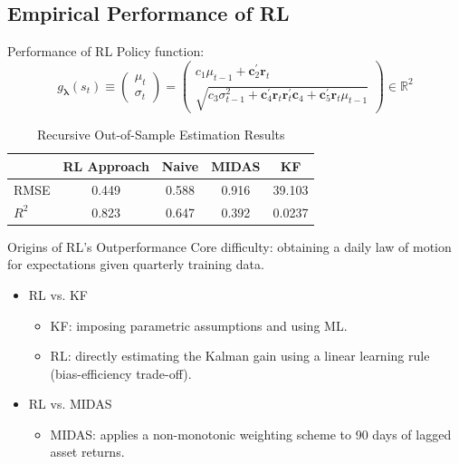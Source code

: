\documentclass[UTF8, 16pt]{beamer}
\begin{document}
\begin{CJK*}{UTF8}{gbsn}
\subsection{Empirical Performance of RL}
\begin{frame}{Performance of RL}
	Policy function:
	$$
	g_{\boldsymbol{\lambda}}\left(s_{t}\right) \equiv\left(\begin{array}{c}\mu_{t} \\ \sigma_{t}\end{array}\right)=\left(\begin{array}{c}c_{1} \mu_{t-1}+\mathbf{c}_{2}^{\prime} \mathbf{r}_{t} \\ \sqrt{c_{3} \sigma_{t-1}^{2}+\mathbf{c}_{4}^{\prime} \mathbf{r}_{t} \mathbf{r}_{t}^{\prime} \mathbf{c}_{4}+\mathbf{c}_{5}^{\prime} \mathbf{r}_{t} \mu_{t-1}}\end{array}\right) \in \mathbb{R}^{2}
	$$
	\begin{table}
	    \centering
	    \caption{Recursive Out-of-Sample Estimation Results}
	    \vspace{-0.5cm}
	    \setlength{\tabcolsep}{4mm}
		    {
		    \begin{tabular}{lcccc}
		    \toprule
	         & RL Approach & Naive & MIDAS & KF \\ \midrule
	        RMSE & 0.449 & 0.588 & 0.916 & 39.103 \\ 
	        $R^2$ & 0.823 & 0.647 & 0.392 & 0.0237 \\ \bottomrule
		    \end{tabular}
		    }
	\end{table}
\end{frame}
\begin{frame}{Origins of RL’s Outperformance}
	Core difficulty: obtaining a daily law of motion for expectations given quarterly training data.
	\begin{itemize}
		\item RL vs. KF
			\begin{itemize}
				\item KF: imposing parametric assumptions and using ML.
				\item RL: directly estimating the Kalman gain using a linear learning rule (\alert{bias-efficiency trade-off}).
			\end{itemize}
		\item RL vs. MIDAS
			\begin{itemize}
				\item MIDAS: applies a non-monotonic weighting scheme to 90 days of lagged asset returns.

\end{itemize}
\end{itemize}
\end{frame}
\end{CJK*}
\end{document}
